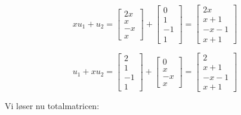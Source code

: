 \documentclass[a4paper,12pt]{article}
\begin{document}
\subsection{}
\[
xu_1 + u_2 = 
\left[\begin{array}{ccc}
    2x\\
    x\\
    -x\\
    x
\end{array}\right]
+
\left[\begin{array}{ccc}
    0\\
    1\\
    -1\\
    1
\end{array}\right]
=
\left[\begin{array}{ccc}
    2x\\
    x+1\\
    -x-1\\
    x+1
\end{array}\right]
\]

\[
u_1 + xu_2 = 
\left[\begin{array}{ccc}
    2\\
    1\\
    -1\\
    1
\end{array}\right]
+
\left[\begin{array}{ccc}
    0\\
    x\\
    -x\\
    x
\end{array}\right]
=
\left[\begin{array}{ccc}
    2\\
    x+1\\
    -x-1\\
    x+1
\end{array}\right]
\]

Vi løser nu totalmatricen:\\
\end{document}
